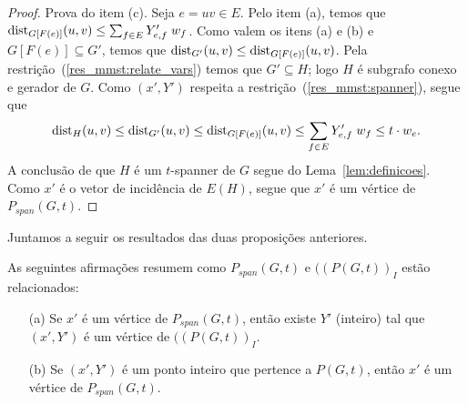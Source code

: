\begin{proposicao}
\begin{proof}
\noindent Prova do item (c).
Seja $e=uv \in E$.
Pelo item (a), temos que 
\mbox{${\mathrm{dist}}_{G[F(e)]}(u,v) \leq  \sum_{f \in E}Y'_{e,f}\;w_f$}. 
Como valem os itens (a) e (b) e 
$G[F(e)] \subseteq G'$, temos que 
\mbox{${\mathrm{dist}}_{G'}(u,v) \le {\mathrm{dist}}_{G[F(e)]}(u,v)$}. 
Pela restrição~(\ref{res_mmst:relate_vars}) temos que $G' \subseteq H$; logo $H$ é subgrafo conexo e gerador de $G$.
Como  $(x',Y')$ respeita a restrição~(\ref{res_mmst:spanner}), segue que 
\begin{equation*}
\begin{split}
{\mathrm{dist}}_{H}(u,v) \le {\mathrm{dist}}_{G'}(u,v) \le {\mathrm{dist}}_{G[F(e)]}(u,v) \leq \sum_{f \in E} Y'_{e,f} \; w_f \le 
t \cdot w_e.
\end{split}
\end{equation*} 
A conclusão de que $H$ é um $t$-spanner de $G$ segue do
Lema~\ref{lem:definicoes}. Como $x'$ é o vetor de incidência de
$E(H)$, segue que  $x'$ é um vértice de $P_{span}(G,t)$.
\end{proof}

\end{proposicao}



Juntamos a seguir  os resultados das duas proposições anteriores.

\begin{proposicao}
   \label{prop:equivalencia_poliedros}
   As seguintes afirmações resumem como  $P_{span}(G,t)$ e $((P(G,t))_I$ estão relacionados:
   \begin{itemize}
     \item[{\rm (a)}] Se $x'$ é um vértice de $P_{span}(G,t)$, então existe $Y'$ (inteiro) tal que $(x',Y')$ é um vértice de $((P(G,t))_I$.
  \item[{\rm (b)}] Se $(x',Y')$ é um ponto inteiro que pertence a $P(G,t)$, então $x'$ é um vértice de $P_{span}(G,t)$.\\
    \end{itemize}
  \end{proposicao}  


